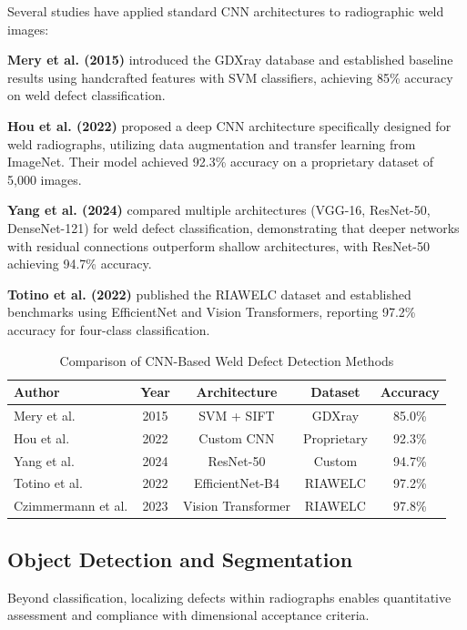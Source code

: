 \documentclass[12pt,a4paper]{report}
\begin{document}
Several studies have applied standard CNN architectures to radiographic weld images:

\textbf{Mery et al. (2015)} introduced the GDXray database and established baseline results using handcrafted features with SVM classifiers, achieving 85\% accuracy on weld defect classification.

\textbf{Hou et al. (2022)} proposed a deep CNN architecture specifically designed for weld radiographs, utilizing data augmentation and transfer learning from ImageNet. Their model achieved 92.3\% accuracy on a proprietary dataset of 5,000 images.

\textbf{Yang et al. (2024)} compared multiple architectures (VGG-16, ResNet-50, DenseNet-121) for weld defect classification, demonstrating that deeper networks with residual connections outperform shallow architectures, with ResNet-50 achieving 94.7\% accuracy.

\textbf{Totino et al. (2022)} published the RIAWELC dataset and established benchmarks using EfficientNet and Vision Transformers, reporting 97.2\% accuracy for four-class classification.

\begin{table}[H]
\centering
\caption{Comparison of CNN-Based Weld Defect Detection Methods}
\label{tab:cnn_comparison}
\begin{tabular}{lcccc}
\toprule
\textbf{Author} & \textbf{Year} & \textbf{Architecture} & \textbf{Dataset} & \textbf{Accuracy} \\
\midrule
Mery et al. & 2015 & SVM + SIFT & GDXray & 85.0\% \\
Hou et al. & 2022 & Custom CNN & Proprietary & 92.3\% \\
Yang et al. & 2024 & ResNet-50 & Custom & 94.7\% \\
Totino et al. & 2022 & EfficientNet-B4 & RIAWELC & 97.2\% \\
Czimmermann et al. & 2023 & Vision Transformer & RIAWELC & 97.8\% \\
\bottomrule
\end{tabular}
\end{table}

\subsection{Object Detection and Segmentation}

Beyond classification, localizing defects within radiographs enables quantitative assessment and compliance with dimensional acceptance criteria.
\end{document}
